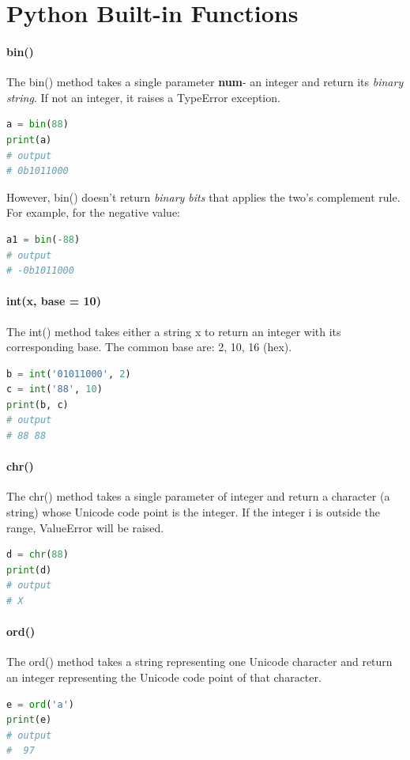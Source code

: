\documentclass[../main.tex]{subfiles}
\begin{document}
\section{Python Built-in Functions}
\label{sec_bitwise_built_in_function}
\paragraph{bin()} The bin() method takes a single parameter \textbf{num}- an integer and return its \textit{binary string}. If not an integer, it raises a TypeError exception. 
\begin{lstlisting}[language=Python]
a = bin(88)
print(a)
# output
# 0b1011000
\end{lstlisting}
However, bin() doesn't return \textit{binary bits} that applies the two's complement rule. For example, for the negative value:
\begin{lstlisting}[language=Python]
a1 = bin(-88)
# output
# -0b1011000
\end{lstlisting}
\paragraph{int(x, base = 10)} The int() method takes either a string x  to return an integer with its corresponding base. The common base are: 2, 10, 16 (hex). 
\begin{lstlisting}[language=Python]
b = int('01011000', 2)
c = int('88', 10)
print(b, c)
# output
# 88 88
\end{lstlisting}

\paragraph{chr()} The chr() method takes a single parameter of integer and return a character (a string) whose Unicode code point is the integer. If the integer i is outside the range, ValueError will be raised.
\begin{lstlisting}[language=Python]
d = chr(88)
print(d)
# output
# X
\end{lstlisting}
\paragraph{ord()} The ord() method takes a string representing one Unicode character and return an integer representing the Unicode code point of that character. 
\begin{lstlisting}[language=Python]
e = ord('a')
print(e)
# output
#  97
\end{lstlisting}
\end{document}
